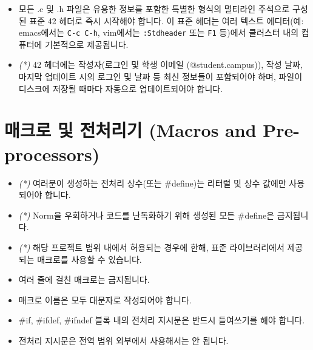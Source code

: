 \documentclass{42-ko}
\begin{document}
        \begin{itemize}

        \item 모든 .c 및 .h 파일은 유용한 정보를 포함한 특별한 형식의 멀티라인 
          주석으로 구성된 표준 42 헤더로 즉시 시작해야 합니다. 이 표준 헤더는 
          여러 텍스트 에디터(예: emacs에서는 \texttt{C-c C-h}, vim에서는 \texttt{:Stdheader} 
          또는 \texttt{F1} 등)에서 클러스터 내의 컴퓨터에 기본적으로 제공됩니다.

        \item \textit{(*)} 42 헤더에는 작성자(로그인 및 학생 이메일 (@student.campus)), 
          작성 날짜, 마지막 업데이트 시의 로그인 및 날짜 등 최신 정보들이 
          포함되어야 하며, 파일이 디스크에 저장될 때마다 자동으로 업데이트되어야 
          합니다.

        \end{itemize}

        \newpage


    \section{매크로 및 전처리기 (Macros and Pre-processors)}

        \begin{itemize}

            \item \textit{(*)} 여러분이 생성하는 전처리 상수(또는 \#define)는 
              리터럴 및 상수 값에만 사용되어야 합니다.
            \item \textit{(*)} Norm을 우회하거나 코드를 난독화하기 위해 생성된 
              모든 \#define은 금지됩니다.
            \item \textit{(*)} 해당 프로젝트 범위 내에서 허용되는 경우에 한해, 
              표준 라이브러리에서 제공되는 매크로를 사용할 수 있습니다.
            \item 여러 줄에 걸친 매크로는 금지됩니다.
            \item 매크로 이름은 모두 대문자로 작성되어야 합니다.
            \item \#if, \#ifdef, \#ifndef 블록 내의 전처리 지시문은 반드시 
              들여쓰기를 해야 합니다.
            \item 전처리 지시문은 전역 범위 외부에서 사용해서는 안 됩니다.

        \end{itemize}
        \newpage
\end{document}
